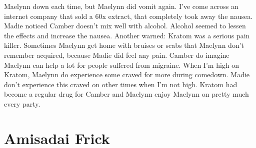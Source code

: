 \documentclass[12pt]{book}
\begin{document}
Maelynn down each time, but Maelynn did vomit again. I've come across an internet company that sold a 60x extract, that completely took away the nausea. Madie noticed Camber doesn't mix well with alcohol. Alcohol seemed to lessen the effects and increase the nausea. Another warned: Kratom was a serious pain killer. Sometimes Maelynn get home with bruises or scabs that Maelynn don't remember acquired, because Madie did feel any pain. Camber do imagine Maelynn can help a lot for people suffered from migraine. When I'm high on Kratom, Maelynn do experience some craved for more during comedown. Madie don't experience this craved on other times when I'm not high. Kratom had become a regular drug for Camber and Maelynn enjoy Maelynn on pretty much every party.



\chapter{Amisadai Frick}
\end{document}
